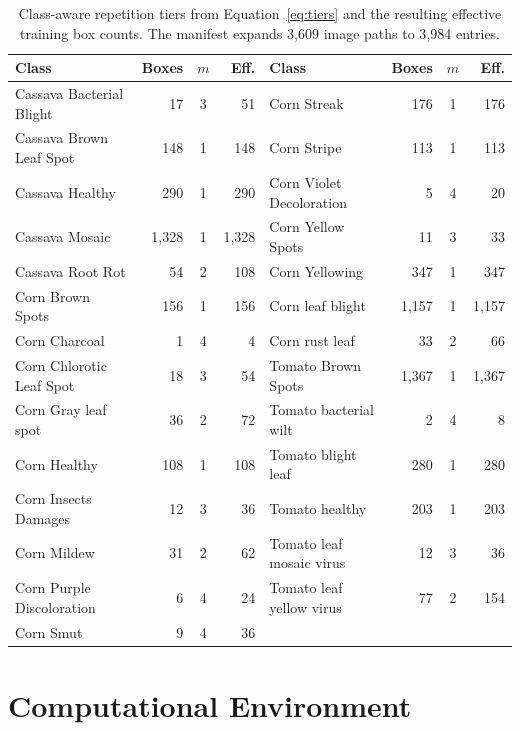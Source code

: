\documentclass[a4paper,8pt]{article}
\begin{document}
\begin{table}[H]
\centering
\scriptsize
\renewcommand{\arraystretch}{1.08}
\begin{tabularx}{0.95\textwidth}{|X|r|c|r||X|r|c|r|}
\hline
\textbf{Class} & \textbf{Boxes} & \textbf{$m$} & \textbf{Eff.} &
\textbf{Class} & \textbf{Boxes} & \textbf{$m$} & \textbf{Eff.}\\
\hline
Cassava Bacterial Blight & 17 & 3 & 51 & Corn Streak & 176 & 1 & 176\\
Cassava Brown Leaf Spot & 148 & 1 & 148 & Corn Stripe & 113 & 1 & 113\\
Cassava Healthy & 290 & 1 & 290 & Corn Violet Decoloration & 5 & 4 & 20\\
Cassava Mosaic & 1{,}328 & 1 & 1{,}328 & Corn Yellow Spots & 11 & 3 & 33\\
Cassava Root Rot & 54 & 2 & 108 & Corn Yellowing & 347 & 1 & 347\\
Corn Brown Spots & 156 & 1 & 156 & Corn leaf blight & 1{,}157 & 1 & 1{,}157\\
Corn Charcoal & 1 & 4 & 4 & Corn rust leaf & 33 & 2 & 66\\
Corn Chlorotic Leaf Spot & 18 & 3 & 54 & Tomato Brown Spots & 1{,}367 & 1 & 1{,}367\\
Corn Gray leaf spot & 36 & 2 & 72 & Tomato bacterial wilt & 2 & 4 & 8\\
Corn Healthy & 108 & 1 & 108 & Tomato blight leaf & 280 & 1 & 280\\
Corn Insects Damages & 12 & 3 & 36 & Tomato healthy & 203 & 1 & 203\\
Corn Mildew & 31 & 2 & 62 & Tomato leaf mosaic virus & 12 & 3 & 36\\
Corn Purple Discoloration & 6 & 4 & 24 & Tomato leaf yellow virus & 77 & 2 & 154\\
Corn Smut & 9 & 4 & 36 & & & & \\
\hline
\end{tabularx}
\caption{Class-aware repetition tiers from Equation~\eqref{eq:tiers} and the resulting effective
training box counts. The manifest expands 3{,}609 image paths to 3{,}984 entries.}
\label{tab:tiers}
\end{table}

\section{Computational Environment}
\label{app:repro}
\end{document}
